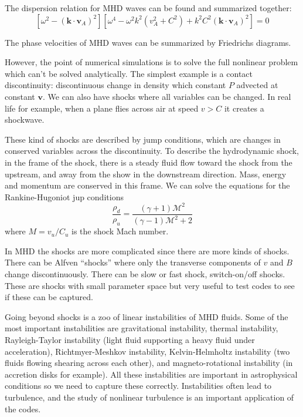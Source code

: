 \documentclass[letterpaper, 11pt]{article}
\numberwithin{equation}{section}
\numberwithin{figure}{section}
\begin{document}
The dispersion relation for MHD waves can be found and summarized together:
\begin{equation}
  \label{eq:3}
  \left[ \omega^2 - (\mathbf{k}\cdot \mathbf{v}_A)^2 \right] \left[ \omega^4 - \omega^2k^2(v_A^2 + C^2) + k^2C^2 (\mathbf{k}\cdot \mathbf{v}_A)^2 \right] = 0
\end{equation}

The phase velocities of MHD waves can be summarized by Friedrichs diagrams.

However, the point of numerical simulations is to solve the full nonlinear
problem which can't be solved analytically. The simplest example is a contact
discontinuity: discontinuous change in density which constant $P$ advected at
constant $\mathbf{v}$. We can also have shocks where all variables can be
changed. In real life for example, when a plane flies across air at speed $v >
C$ it creates a shockwave. 

These kind of shocks are described by jump conditions, which are changes in
conserved variables across the discontinuity. To describe the hydrodynamic
shock, in the frame of the shock, there is a steady fluid flow toward the shock
from the upstream, and away from the show in the downstream direction. Mass,
energy and momentum are conserved in this frame. We can solve the equations for
the Rankine-Hugoniot jup conditions
\begin{equation}
  \label{eq:5}
  \frac{\rho_d}{\rho_u} = \frac{(\gamma + 1)\mathcal{M}^2}{(\gamma - 1)\mathcal{M}^2 + 2}
\end{equation}
where $M = v_u/C_u$ is the shock Mach number.

In MHD the shocks are more complicated since there are more kinds of shocks.
There can be Alfven ``shocks'' where only the transverse components of $v$ and
$B$ change discontinuously. There can be slow or fast shock, switch-on/off
shocks. These are shocks with small parameter space but very useful to test
codes to see if these can be captured.

Going beyond shocks is a zoo of linear instabilities of MHD fluids. Some of the
most important instabilities are gravitational instability, thermal instability,
Rayleigh-Taylor instability (light fluid supporting a heavy fluid under
acceleration), Richtmyer-Meshkov instability, Kelvin-Helmholtz instability (two
fluids flowing shearing across each other), and magneto-rotational instability
(in accretion disks for example). All these instabilities are important in
astrophysical conditions so we need to capture these correctly. Instabilities
often lead to turbulence, and the study of nonlinear turbulence is an important
application of the codes.
\end{document}
